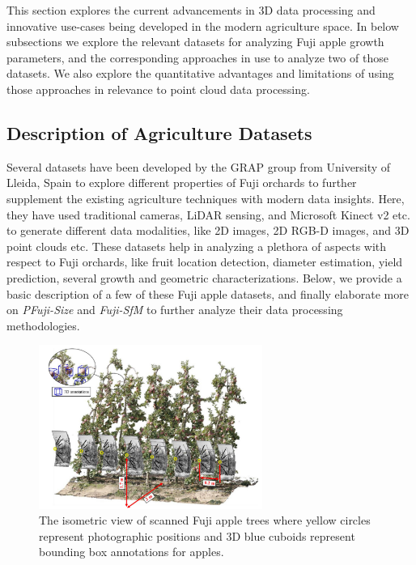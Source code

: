 \documentclass{article}
\begin{document}
This section explores the current advancements in 3D data processing and innovative use-cases being developed in the modern agriculture space.
In below subsections we explore the relevant datasets for analyzing Fuji apple growth parameters, and the corresponding approaches in use to analyze two of those datasets.
We also explore the quantitative advantages and limitations of using those approaches in relevance to point cloud data processing.


\subsection{Description of Agriculture Datasets}


Several datasets have been developed by the GRAP group from University of Lleida, Spain to explore different properties of Fuji orchards to further supplement the existing agriculture techniques with modern data insights.
Here, they have used traditional cameras, LiDAR sensing, and Microsoft Kinect v2 etc. to generate different data modalities, like 2D images, 2D RGB-D images, and 3D point clouds etc.
These datasets help in analyzing a plethora of aspects with respect to Fuji orchards, like fruit location detection, diameter estimation, yield prediction, several growth and geometric characterizations.
Below, we provide a basic description of a few of these Fuji apple datasets, and finally elaborate more on \textit{PFuji-Size} and \textit{Fuji-SfM} to further analyze their data processing methodologies.


\begin{figure}[h]
    \centering
    \includegraphics[width=0.65\textwidth]{fuji-sfm-dataset.png}
    \caption{The isometric view of scanned Fuji apple trees where yellow circles represent photographic positions and 3D blue cuboids represent bounding box annotations for apples.}
    \label{fig:fuji-sfm}
\end{figure}
\end{document}
